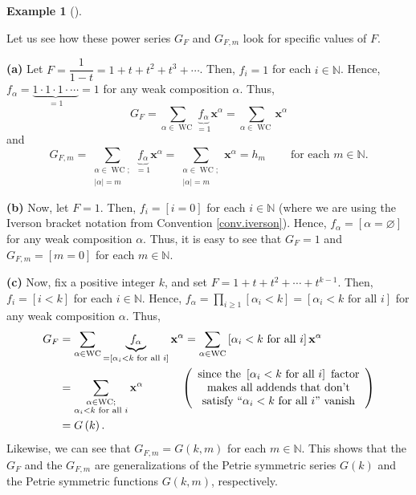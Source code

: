 \documentclass[numbers=enddot,12pt,final,onecolumn,notitlepage]{scrartcl}%
\theoremstyle{definition}
\newtheorem{exam}[theo]{Example}
\newenvironment{example}[1][]
{\begin{exam}[#1]\begin{leftbar}}
{\end{leftbar}\end{exam}}
\let\sumnonlimits\sum
\let\prodnonlimits\prod
\renewcommand{\sum}{\sumnonlimits\limits}
\renewcommand{\prod}{\prodnonlimits\limits}
\begin{document}
\begin{example}
\label{exa.GF.GF123}Let us see how these power series $G_{F}$ and $G_{F,m}$
look for specific values of $F$.

\textbf{(a)} Let $F=\dfrac{1}{1-t}=1+t+t^{2}+t^{3}+\cdots$. Then, $f_{i}=1$
for each $i\in\mathbb{N}$. Hence, $f_{\alpha}=\underbrace{1\cdot1\cdot
1\cdot\cdots}_{=1}=1$ for any weak composition $\alpha$. Thus,
\[
G_{F}=\sum_{\alpha\in\operatorname*{WC}}\underbrace{f_{\alpha}}_{=1}%
\mathbf{x}^{\alpha}=\sum_{\alpha\in\operatorname*{WC}}\mathbf{x}^{\alpha}%
\]
and%
\[
G_{F,m}=\sum_{\substack{\alpha\in\operatorname*{WC};\\\left\vert
\alpha\right\vert =m}}\underbrace{f_{\alpha}}_{=1}\mathbf{x}^{\alpha}%
=\sum_{\substack{\alpha\in\operatorname*{WC};\\\left\vert \alpha\right\vert
=m}}\mathbf{x}^{\alpha}=h_{m}\ \ \ \ \ \ \ \ \ \ \text{for each }%
m\in\mathbb{N}.
\]


\textbf{(b)} Now, let $F=1$. Then, $f_{i}=\left[  i=0\right]  $ for each
$i\in\mathbb{N}$ (where we are using the Iverson bracket notation from
Convention \ref{conv.iverson}). Hence, $f_{\alpha}=\left[  \alpha
=\varnothing\right]  $ for any weak composition $\alpha$. Thus, it is easy to
see that $G_{F}=1$ and $G_{F,m}=\left[  m=0\right]  $ for each $m\in
\mathbb{N}$.

\textbf{(c)} Now, fix a positive integer $k$, and set $F=1+t+t^{2}%
+\cdots+t^{k-1}$. Then, $f_{i}=\left[  i<k\right]  $ for each $i\in\mathbb{N}%
$. Hence, $f_{\alpha}=\prod_{i\geq1}\left[  \alpha_{i}<k\right]  =\left[
\alpha_{i}<k\text{ for all }i\right]  $ for any weak composition $\alpha$.
Thus,
\begin{align*}
G_{F}  &  =\sum_{\alpha\in\operatorname*{WC}}\underbrace{f_{\alpha}}_{=\left[
\alpha_{i}<k\text{ for all }i\right]  }\mathbf{x}^{\alpha}=\sum_{\alpha
\in\operatorname*{WC}}\left[  \alpha_{i}<k\text{ for all }i\right]
\mathbf{x}^{\alpha}\\
&  =\sum_{\substack{\alpha\in\operatorname*{WC};\\\alpha_{i}<k\text{ for all
}i}}\mathbf{x}^{\alpha}\ \ \ \ \ \ \ \ \ \ \left(
\begin{array}
[c]{c}%
\text{since the }\left[  \alpha_{i}<k\text{ for all }i\right]  \text{
factor}\\
\text{makes all addends that don't}\\
\text{satisfy \textquotedblleft}\alpha_{i}<k\text{ for all }%
i\text{\textquotedblright\ vanish}%
\end{array}
\right) \\
&  =G\left(  k\right)  .
\end{align*}
Likewise, we can see that $G_{F,m}=G\left(  k,m\right)  $ for each
$m\in\mathbb{N}$. This shows that the $G_{F}$ and the $G_{F,m}$ are
generalizations of the Petrie symmetric series $G\left(  k\right)  $ and the
Petrie symmetric functions $G\left(  k,m\right)  $, respectively.
\end{example}
\end{document}
